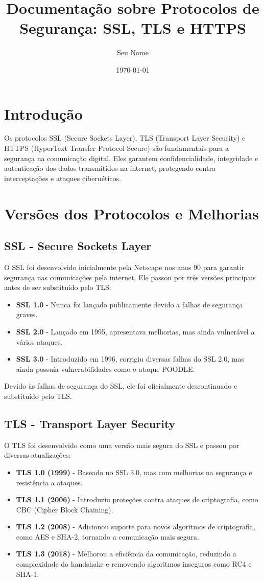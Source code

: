 \documentclass[a4paper,12pt]{article}
\title{Documentação sobre Protocolos de Segurança: SSL, TLS e HTTPS}
\author{Seu Nome}
\date{\today}
\begin{document}
\maketitle

\section{Introdução}
Os protocolos SSL (Secure Sockets Layer), TLS (Transport Layer Security) e HTTPS (HyperText Transfer Protocol Secure) são fundamentais para a segurança na comunicação digital. Eles garantem confidencialidade, integridade e autenticação dos dados transmitidos na internet, protegendo contra interceptações e ataques cibernéticos.

\section{Versões dos Protocolos e Melhorias}

\subsection{SSL - Secure Sockets Layer}
O SSL foi desenvolvido inicialmente pela Netscape nos anos 90 para garantir segurança nas comunicações pela internet. Ele passou por três versões principais antes de ser substituído pelo TLS:

\begin{itemize}
\item \textbf{SSL 1.0} - Nunca foi lançado publicamente devido a falhas de segurança graves.
\item \textbf{SSL 2.0} - Lançado em 1995, apresentava melhorias, mas ainda vulnerável a vários ataques.
\item \textbf{SSL 3.0} - Introduzido em 1996, corrigiu diversas falhas do SSL 2.0, mas ainda possuía vulnerabilidades como o ataque POODLE.
\end{itemize}

Devido às falhas de segurança do SSL, ele foi oficialmente descontinuado e substituído pelo TLS.

\subsection{TLS - Transport Layer Security}
O TLS foi desenvolvido como uma versão mais segura do SSL e passou por diversas atualizações:

\begin{itemize}
\item \textbf{TLS 1.0 (1999)} - Baseado no SSL 3.0, mas com melhorias na segurança e resistência a ataques.
\item \textbf{TLS 1.1 (2006)} - Introduziu proteções contra ataques de criptografia, como CBC (Cipher Block Chaining).
\item \textbf{TLS 1.2 (2008)} - Adicionou suporte para novos algoritmos de criptografia, como AES e SHA-2, tornando a comunicação mais segura.
\item \textbf{TLS 1.3 (2018)} - Melhorou a eficiência da comunicação, reduzindo a complexidade do handshake e removendo algoritmos inseguros como RC4 e SHA-1.
\end{itemize}
\end{document}
